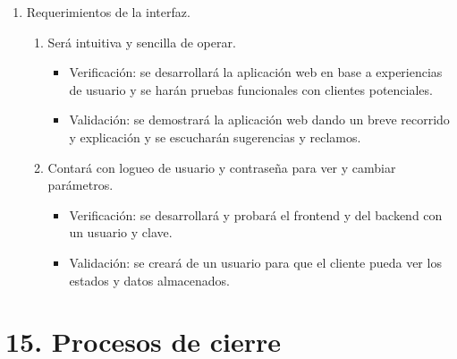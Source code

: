 \documentclass[
11pt, %
]{charter}
\begin{document}
\begin{enumerate}
	\item Requerimientos de la interfaz.
		\begin{enumerate}
			\item Será intuitiva y sencilla de operar.
			\begin{itemize}
				\item Verificación: se desarrollará la aplicación web en base a experiencias de usuario y se harán pruebas funcionales con clientes potenciales.
				\item Validación: se demostrará la aplicación web dando un breve recorrido y explicación y se escucharán sugerencias y reclamos.
			\end{itemize}
			\item Contará con logueo de usuario y contraseña para ver y cambiar parámetros.
			\begin{itemize}
				\item Verificación: se desarrollará y probará el frontend y del backend con un usuario y clave.
				\item Validación: se creará de un usuario para que el cliente pueda ver los estados y datos almacenados.
			\end{itemize}
		\end{enumerate}
\end{enumerate}

\section{15. Procesos de cierre}    
\label{sec:cierre}
\end{document}
